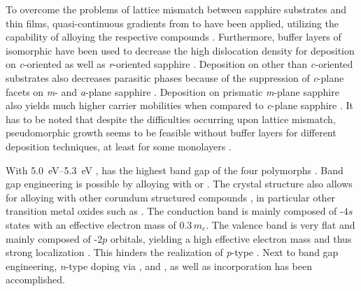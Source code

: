 To overcome the problems of lattice mismatch between sapphire substrates and \agao{} thin films, quasi-continuous gradients from  to \agao{} have been applied, utilizing the capability of alloying the respective compounds
    \cite{jinno2016}.
Furthermore, buffer layers of isomorphic  have been used to decrease the high dislocation density for deposition on \textit{c}-oriented
    \cite{stepanov2021,polyakov2022a}
as well as \textit{r}-oriented sapphire
    \cite{polyakov2022}.
Deposition on other than \textit{c}-oriented substrates also decreases parasitic phases because of the suppression of \textit{c}-plane facets on \textit{m}- and \textit{a}-plane sapphire
    \cite{jinno2021}.
Deposition on prismatic \textit{m}-plane sapphire also yields much higher carrier mobilities when compared to \textit{c}-plane sapphire
    \cite{akaiwa2020}.
It has to be noted that despite the difficulties occurring upon lattice mismatch, pseudomorphic growth seems to be feasible without buffer layers for different deposition techniques, at least for some monolayers
    \cite{schewski2015}.

With \qtyrange{5.0}{5.3}{\eV}
    \cite{yang2022},
\agao{} has the highest band gap of the four polymorphs
    \cite{pearton2018}.
Band gap engineering is possible by alloying with 
    \cite{jinno2021}
or 
    \cite{hassa2020}.
The crystal structure also allows for alloying with other corundum structured compounds
    \cite{yang2022},
in particular other transition metal oxides such as 
    \cite{polyakov2022,polyakov2022a}.
The conduction band is mainly composed of -$4s$ states with an effective electron mass of $0.3\,m_e$.
The valence band is very flat and mainly composed of -$2p$ orbitals, yielding a high effective electron mass and thus strong localization
    \cite{pearton2018}.
This hinders the realization of \textit{p}-type \agao.
Next to band gap engineering, \textit{n}-type doping via ,  and  
    \cite{vogt2023},
as well as 
    \cite{vogt2024}
incorporation has been accomplished.
